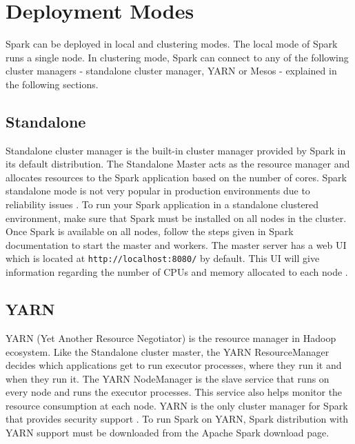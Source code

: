 \documentclass[9pt,twocolumn,twoside]{../../styles/osajnl}
\begin{document}
\section{Deployment Modes}

Spark can be deployed in local and clustering modes. The local mode of
Spark runs a single node. In clustering mode, Spark can connect to any
of the following cluster managers - standalone cluster manager, YARN
or Mesos - explained in the following sections.

\subsection{Standalone}
Standalone cluster manager is the built-in cluster manager provided by
Spark in its default distribution. The Standalone Master acts as the
resource manager and allocates resources to the Spark application
based on the number of cores. Spark standalone mode is not very
popular in production environments due to reliability issues
\cite{www-clusters}. To run your Spark application in a standalone
clustered environment, make sure that Spark must be installed on all
nodes in the cluster. Once Spark is available on all nodes, follow the
steps given in Spark documentation \cite{www-spark-standalone} to
start the master and workers. The master server has a web UI which is
located at \texttt{http://localhost:8080/} by default. This UI will
give information regarding the number of CPUs and memory allocated to
each node \cite{www-spark-standalone}.

\subsection{YARN}
YARN (Yet Another Resource Negotiator) is the resource manager in
Hadoop ecosystem. Like the Standalone cluster master, the YARN
ResourceManager decides which applications get to run executor
processes, where they run it and when they run it. The YARN
NodeManager is the slave service that runs on every node and runs the
executor processes. This service also helps monitor the resource
consumption at each node. YARN is the only cluster manager for Spark
that provides security support \cite{www-clusters}. To run Spark on
YARN, Spark distribution with YARN support must be downloaded from the
Apache Spark download page.
\end{document}
